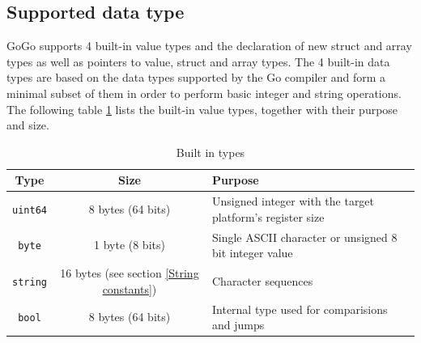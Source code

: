 \documentclass[a4paper]{scrartcl}
\let\section\subsection
\let\subsection\subsubsection
\let\subsubsection\paragraph
\let\paragraph\subparagraph
\let\subparagraph\undefined
\begin{document}
    \section{Supported data type}
      GoGo supports 4 built-in value types and the declaration of new struct and array types as well as pointers to value, struct and array types. The 4 built-in data types are based on the data types supported by the Go compiler and form a minimal subset of them in order to perform basic integer and string operations. The following table \ref{tbl:types} lists the built-in value types, together with their purpose and size.
      
      \begin{table}[htb]
      \centering
      \begin{tabular}{cc p{}}
        \toprule
        \textbf{Type} & \textbf{Size} & \textbf{Purpose}\\
        \midrule
        \texttt{uint64} & 8 bytes (64 bits) & Unsigned integer with the target platform's register size\\
        \texttt{byte} & 1 byte (8 bits) & Single ASCII character or unsigned 8 bit integer value\\
        \texttt{string} & 16 bytes (see section \ref{String constants}) & Character sequences\\
        \texttt{bool} & 8 bytes (64 bits) & Internal type used for comparisions and jumps\\
        \bottomrule
      \end{tabular}
      \caption{Built in types}
      \label{tbl:types}
	  \end{table}
\end{document}
